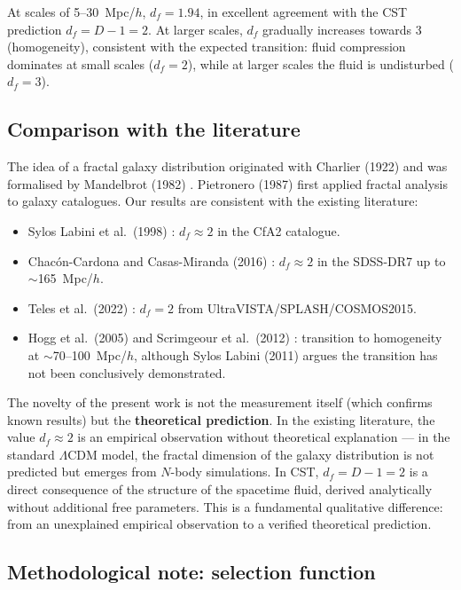 \documentclass[10pt,a4paper]{article}
\begin{document}
At scales of 5--30~Mpc/$h$, $d_f = 1.94$, in excellent agreement with the CST prediction $d_f = D - 1 = 2$. At larger scales, $d_f$ gradually increases towards 3 (homogeneity), consistent with the expected transition: fluid compression dominates at small scales ($d_f = 2$), while at larger scales the fluid is undisturbed ($d_f = 3$).

\subsection{Comparison with the literature}

The idea of a fractal galaxy distribution originated with Charlier (1922) \cite{Charlier1922} and was formalised by Mandelbrot (1982) \cite{Mandelbrot1982}. Pietronero (1987) \cite{Pietronero1987} first applied fractal analysis to galaxy catalogues. Our results are consistent with the existing literature:

\begin{itemize}
\item Sylos Labini et al.\ (1998) \cite{SylosLabini1998}: $d_f \approx 2$ in the CfA2 catalogue.
\item Chac\'on-Cardona and Casas-Miranda (2016) \cite{ChaconCardona2016}: $d_f \approx 2$ in the SDSS-DR7 up to $\sim$165~Mpc/$h$.
\item Teles et al.\ (2022) \cite{Teles2022}: $d_f = 2$ from UltraVISTA/SPLASH/COSMOS2015.
\item Hogg et al.\ (2005) \cite{Hogg2005} and Scrimgeour et al.\ (2012) \cite{Scrimgeour2012}: transition to homogeneity at $\sim$70--100~Mpc/$h$, although Sylos Labini (2011) \cite{SylosLabini2011} argues the transition has not been conclusively demonstrated.
\end{itemize}

The novelty of the present work is not the measurement itself (which confirms known results) but the \textbf{theoretical prediction}. In the existing literature, the value $d_f \approx 2$ is an empirical observation without theoretical explanation --- in the standard $\Lambda$CDM model, the fractal dimension of the galaxy distribution is not predicted but emerges from $N$-body simulations. In CST, $d_f = D - 1 = 2$ is a direct consequence of the structure of the spacetime fluid, derived analytically without additional free parameters. This is a fundamental qualitative difference: from an unexplained empirical observation to a verified theoretical prediction.

\subsection{Methodological note: selection function}
\end{document}

